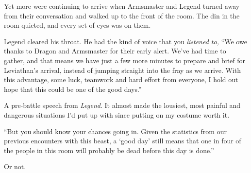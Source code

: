 Yet more were continuing to arrive when Armsmaster and Legend turned away from their conversation and walked up to the front of the room.  The din in the room quieted, and every set of eyes was on them.



Legend cleared his throat.  He had the kind of voice that you \emph{listened to, }``We owe thanks to Dragon and Armsmaster for their early alert.  We've had time to gather, and that means we have just a few more minutes to prepare and brief for Leviathan's arrival, instead of jumping straight into the fray as we arrive.  With this advantage, some luck, teamwork and hard effort from everyone, I hold out hope that this could be one of the good days.''



A pre-battle speech from \emph{Legend}.  It almost made the lousiest, most painful and dangerous situations I'd put up with since putting on my costume worth it.



``But you should know your chances going in.  Given the statistics from our previous encounters with this beast, a `good day' still means that one in four of the people in this room will probably be dead before this day is done.''



Or not.





